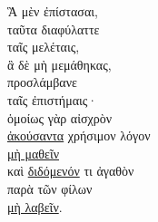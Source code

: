 
{\large
\noindent Ἃ μὲν ἐπίστασαι, \\
\tabto{2em} ταῦτα διαφύλαττε \\
\tabto{4em} ταῖς μελέταις, \\
ἃ δὲ μὴ μεμάθηκας, \\
\tabto{2em} προσλάμβανε \\
\tabto{4em} ταῖς ἐπιστήμαις· \\
ὁμοίως γὰρ αἰσχρὸν \\
\tabto{2em} \underline{ἀκούσαντα} χρήσιμον λόγον \\
\tabto{2em} \underline{μὴ μαθεῖν} \\
\tabto{2em} καὶ \underline{διδόμενόν} τι ἀγαθὸν \\
\tabto{4em} παρὰ τῶν φίλων \\
\tabto{2em} \underline{μὴ λαβεῖν}.\\

}

